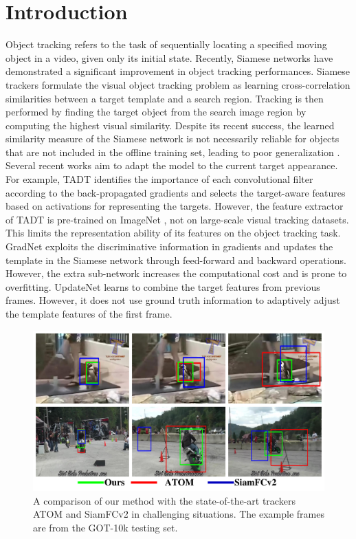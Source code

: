 \section{Introduction}
Object tracking refers to the task of sequentially locating a specified moving object in a video, given only its initial state. Recently, Siamese networks \cite{danelljan2019atom, SiamFC} have demonstrated a significant improvement in object tracking performances. Siamese trackers formulate the visual object tracking problem as learning cross-correlation similarities between a target template and a search region. Tracking is then performed by finding the target object from the search image region by computing the highest visual similarity. Despite its recent success, the learned similarity measure of the Siamese network is not necessarily reliable for objects that are not included in the offline training set, leading to poor generalization \cite{Bhat_2019_ICCV}. Several recent works aim to adapt the model to the current target appearance. For example, TADT \cite{Li_2019_CVPR} identifies the importance of each convolutional filter according to the back-propagated gradients and selects the target-aware features based on activations for representing the targets. However, the feature extractor of TADT is pre-trained on ImageNet \cite{VID}, not on large-scale visual tracking datasets. This limits the representation ability of its features on the object tracking task. GradNet \cite{Li_2019_ICCV} exploits the discriminative information in gradients and updates the template in the Siamese network through feed-forward and backward operations. However, the extra sub-network increases the computational cost and is prone to overfitting. UpdateNet \cite{Zhang_2019_ICCV} learns to combine the target features from previous frames. However, it does not use ground truth information to adaptively adjust the template features of the first frame.

\begin{figure}[t]
    \centering
    \includegraphics[width=1.0\textwidth]{Img/MTP/got10k/visulization2.pdf}
    \caption{A comparison of our method with the state-of-the-art trackers ATOM \cite{danelljan2019atom} and SiamFCv2 \cite{SiamFC} in challenging situations. The example frames are from the GOT-10k \cite{GOT-10k} testing set.}
    \label{fig:vis}
\end{figure}

